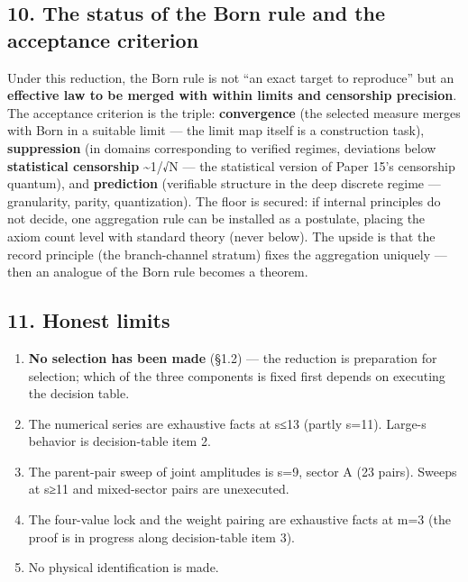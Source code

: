 \documentclass[
]{article}
\providecommand{\tightlist}{%
  \setlength{\itemsep}{0pt}\setlength{\parskip}{0pt}}
\begin{document}
\subsection{10. The status of the Born rule and the acceptance
criterion}\label{the-status-of-the-born-rule-and-the-acceptance-criterion}

Under this reduction, the Born rule is not ``an exact target to
reproduce'' but an \textbf{effective law to be merged with within limits
and censorship precision}. The acceptance criterion is the triple:
\textbf{convergence} (the selected measure merges with Born in a
suitable limit --- the limit map itself is a construction task),
\textbf{suppression} (in domains corresponding to verified regimes,
deviations below \textbf{statistical censorship} \textasciitilde1/√N ---
the statistical version of Paper 15's censorship quantum), and
\textbf{prediction} (verifiable structure in the deep discrete regime
--- granularity, parity, quantization). The floor is secured: if
internal principles do not decide, one aggregation rule can be installed
as a postulate, placing the axiom count level with standard theory
(never below). The upside is that the record principle (the
branch-channel stratum) fixes the aggregation uniquely --- then an
analogue of the Born rule becomes a theorem.

\subsection{11. Honest limits}\label{honest-limits}

\begin{enumerate}
\def\labelenumi{\arabic{enumi}.}
\tightlist
\item
  \textbf{No selection has been made} (§1.2) --- the reduction is
  preparation for selection; which of the three components is fixed
  first depends on executing the decision table.
\item
  The numerical series are exhaustive facts at s≤13 (partly s=11).
  Large-s behavior is decision-table item 2.
\item
  The parent-pair sweep of joint amplitudes is s=9, sector A (23 pairs).
  Sweeps at s≥11 and mixed-sector pairs are unexecuted.
\item
  The four-value lock and the weight pairing are exhaustive facts at m=3
  (the proof is in progress along decision-table item 3).
\item
  No physical identification is made.
\end{enumerate}
\end{document}
